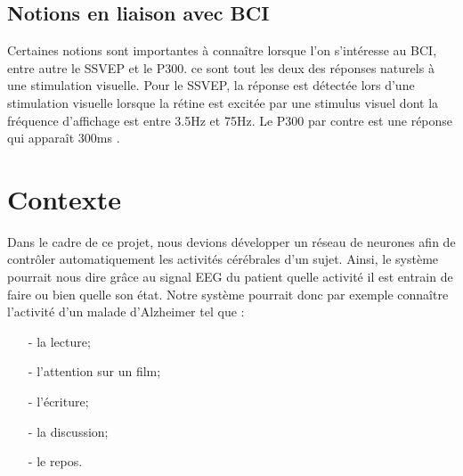 	\subsection{Notions en liaison avec BCI} %
	\label{sub:notion_lien}
	Certaines notions sont importantes à connaître lorsque l'on s’intéresse au BCI, entre autre le SSVEP  et le P300. ce sont tout les deux des réponses naturels à une stimulation visuelle. Pour le SSVEP, la réponse est détectée lors d'une stimulation visuelle lorsque la rétine est excitée par une stimulus visuel dont la fréquence d'affichage est entre 3.5Hz et 75Hz. Le P300 par contre 
	est une réponse qui apparaît 300ms . 
	

	\section{Contexte} %
	\label{sec:contexte}
	
	   Dans le cadre de ce projet, nous devions développer un réseau de neurones afin de contrôler 
	   automatiquement les activités cérébrales d'un sujet. Ainsi, le système pourrait nous dire grâce au signal EEG
	    du patient quelle activité il est entrain de faire ou bien quelle son état. 
	   Notre système pourrait donc par exemple connaître l'activité d'un malade d'Alzheimer tel que : 
	   \begin{itemize}
	   	\item[-] la lecture;
		\item[-] l'attention sur un film;
		\item[-] l'écriture;
		\item[-] la discussion;
		\item[-] le repos.
	   \end{itemize}
	
	
	
	

